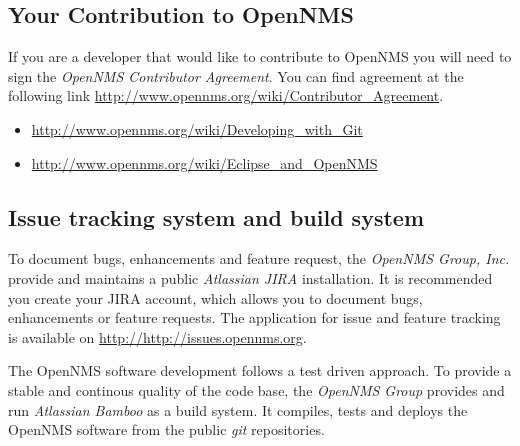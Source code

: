 \subsection*{Your Contribution to OpenNMS}
If you are a developer that would like to contribute to OpenNMS you will need to sign the \emph{OpenNMS Contributor Agreement}. You can find agreement at the following link \url{http://www.opennms.org/wiki/Contributor_Agreement}.
\begin{itemize}
  \item \url{http://www.opennms.org/wiki/Developing_with_Git}
  \item \url{http://www.opennms.org/wiki/Eclipse_and_OpenNMS}
\end{itemize}

\subsection*{Issue tracking system and build system}
To document bugs, enhancements and feature request, the \emph{OpenNMS Group, Inc.} provide and maintains a public \emph{Atlassian JIRA} installation. It is recommended you create your JIRA account, which allows you to document bugs, enhancements or feature requests. The application for issue and feature tracking is available on \url{http://http://issues.opennms.org}.

The OpenNMS software development follows a test driven approach. To provide a stable and continous quality of the code base, the \emph{OpenNMS Group} provides and run \emph{Atlassian Bamboo} as a build system. It compiles, tests and deploys the OpenNMS software from the public \emph{git} repositories.